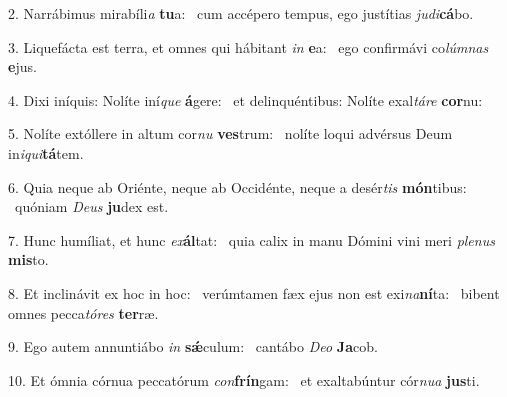 2. Narrábimus mirabíli\textit{a} \textbf{tu}a: \ast\  cum accépero tempus, ego justítias \textit{ju}\textit{di}\textbf{cá}bo.\

3. Liquefácta est terra, et omnes qui hábitant \textit{in} \textbf{e}a: \ast\  ego confirmávi co\textit{lúm}\textit{nas} \textbf{e}jus.\

4. Dixi iníquis: Nolíte iní\textit{que} \textbf{á}gere: \ast\  et delinquéntibus: Nolíte exal\textit{tá}\textit{re} \textbf{cor}nu:\

5. Nolíte extóllere in altum cor\textit{nu} \textbf{ves}trum: \ast\  nolíte loqui advérsus Deum in\textit{i}\textit{qui}\textbf{tá}tem.\

6. Quia neque ab Oriénte, neque ab Occidénte, neque a desér\textit{tis} \textbf{món}tibus: \ast\  quóniam \textit{De}\textit{us} \textbf{ju}dex est.\

7. Hunc humíliat, et hunc \textit{ex}\textbf{ál}tat: \ast\  quia calix in manu Dómini vini meri \textit{ple}\textit{nus} \textbf{mis}to.\

8. Et inclinávit ex hoc in hoc: \dag\  verúmtamen fæx ejus non est exi\textit{na}\textbf{ní}ta: \ast\  bibent omnes pecca\textit{tó}\textit{res} \textbf{ter}ræ.\

9. Ego autem annuntiábo \textit{in} \textbf{sǽ}culum: \ast\  cantábo \textit{De}\textit{o} \textbf{Ja}cob.\

10. Et ómnia córnua peccatórum \textit{con}\textbf{frín}gam: \ast\  et exaltabúntur cór\textit{nu}\textit{a} \textbf{jus}ti.\

